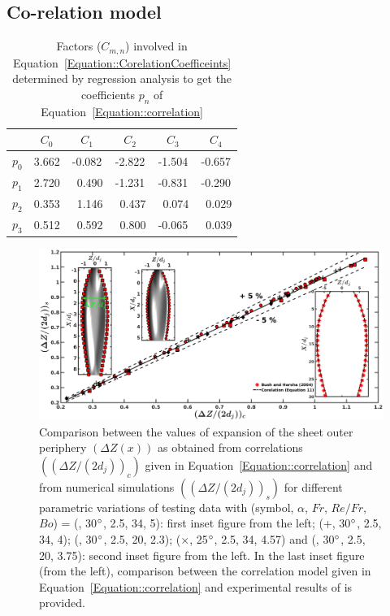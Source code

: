 \documentclass[%
aip,
sd,%
amsmath,amssymb,
preprint,%
author-year,%
]{revtex4-1}
\begin{document}
\subsection{Co-relation model}
\begin{table}[]
	\centering
	\caption{Factors ($C_{m,n}$) involved in Equation~\ref{Equation::CorelationCoefficeints} determined by regression analysis to get the coefficients $p_n$ of Equation~\ref{Equation::correlation}}
	\label{Table::CorrelationPrams}
	\begin{tabular}{@{}c|ccccc@{}}
		\hline
		&$C_0$ & $C_1$ & $C_2$ & $C_3$ & $C_4$    \\ \hline
		$p_0$&3.662&-0.082&-2.822&-1.504&-0.657\\
		$p_1$&2.720&~0.490&-1.231&-0.831&-0.290\\
		$p_2$&0.353&~1.146&~0.437&~0.074&~0.029\\
		$p_3$&0.512&~0.592&~0.800&-0.065&~0.039\\ \hline
	\end{tabular}
\end{table}
\begin{figure}
	\centering
	\includegraphics[width=\linewidth]{corelatehx}
	\caption{Comparison between the values of expansion of the sheet outer periphery $\left(\Delta Z(x)\right)$ as obtained from correlations $\left((\Delta Z/(2d_j))_c\right)$ given in Equation~\ref{Equation::correlation} and from numerical simulations $\left((\Delta Z/(2d_j))_s\right)$ for different parametric variations of testing data with (symbol, $\alpha$, $Fr$, $Re/Fr$, $Bo$) = (\protect\MarkerSquareRed, 30$\degree$, 2.5, 34, 5): first inset figure from the left; (+, 30$\degree$, 2.5, 34, 4); (\protect \MarkerDiamondBlack, 30$\degree$, 2.5, 20, 2.3); ($\times$, 25$\degree$, 2.5, 34, 4.57) and (\protect \MarkerCircleRed, 30$\degree$, 2.5, 20, 3.75): second inset figure from the left. In the last inset figure (from the left), comparison between the  correlation model given in Equation~\ref{Equation::correlation} and experimental results of \cite{bush2004collision} is provided.}
	\label{Figure::corelatehx}
\end{figure}
\end{document}
